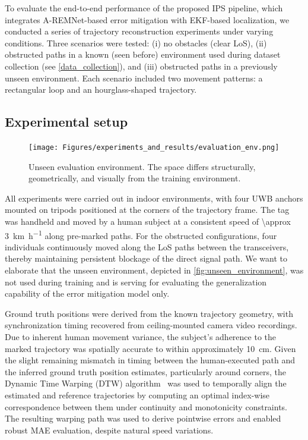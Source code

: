 To evaluate the end-to-end performance of the proposed IPS pipeline, which integrates A-REMNet-based error mitigation with EKF-based localization, we conducted a series of trajectory reconstruction experiments under varying conditions. Three scenarios were tested: (i) no obstacles (clear LoS), (ii) obstructed paths in a known (seen before) environment used during dataset collection (see \autoref{data_collection}), and (iii) obstructed paths in a previously unseen environment. Each scenario included two movement patterns: a rectangular loop and an hourglass-shaped trajectory.

\subsection{Experimental setup}

\begin{figure}[tbh]
    \centering
    \texttt{[image: Figures/experiments\_and\_results/evaluation\_env.png]}
    \caption[Unseen evaluation environment.]{Unseen evaluation environment. The space differs structurally, geometrically, and visually from the training environment.}
    \label{fig:unseen_environment}
\end{figure}

All experiments were carried out in indoor environments, with four UWB anchors mounted on tripods positioned at the corners of the trajectory frame. The tag was handheld and moved by a human subject at a consistent speed of \SI[per-mode=symbol]{\approx 3}{\kilo\metre\per\hour} along pre-marked paths. For the obstructed configurations, four individuals continuously moved along the LoS paths between the transceivers, thereby maintaining persistent blockage of the direct signal path. We want to elaborate that the unseen environment, depicted in \autoref{fig:unseen_environment}, was not used during training and is serving for evaluating the generalization capability of the error mitigation model only.

Ground truth positions were derived from the known trajectory geometry, with synchronization timing recovered from ceiling-mounted camera video recordings. Due to inherent human movement variance, the subject's adherence to the marked trajectory was spatially accurate to within approximately \SI{10}{\centi\meter}. Given the slight remaining mismatch in timing between the human-executed path and the inferred ground truth position estimates, particularly around corners, the Dynamic Time Warping (DTW) algorithm~\cite{dtw} was used to temporally align the estimated and reference trajectories by computing an optimal index-wise correspondence between them under continuity and monotonicity constraints. The resulting warping path was used to derive pointwise errors and enabled robust MAE evaluation, despite natural speed variations.

